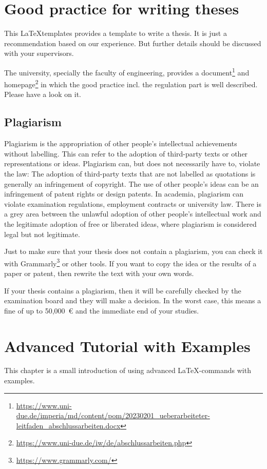 \chapter{Good practice for writing theses}
This \LaTeX templates provides a template to write a thesis. It is just a recommendation based on our experience. But further details should be discussed with your supervisors.

The university, specially the faculty of engineering, provides a document\footnote{\url{https://www.uni-due.de/imperia/md/content/pom/20230201_ueberarbeiteter-leitfaden_abschlussarbeiten.docx}} and homepage\footnote{\url{https://www.uni-due.de/iw/de/abschlussarbeiten.php}} in which the good practice incl. the regulation part is well described. Please have a look on it.
\section*{Plagiarism}
Plagiarism is the appropriation of other people's intellectual achievements without labelling. This can refer to the adoption of third-party texts or other representations or ideas. Plagiarism can, but does not necessarily have to, violate the law: The adoption of third-party texts that are not labelled as quotations is generally an infringement of copyright. The use of other people's ideas can be an infringement of patent rights or design patents. In academia, plagiarism can violate examination regulations, employment contracts or university law. There is a grey area between the unlawful adoption of other people's intellectual work and the legitimate adoption of free or liberated ideas, where plagiarism is considered legal but not legitimate.

Just to make sure that your thesis does not contain a plagiarism, you can check it with Grammarly\footnote{\url{https://www.grammarly.com/}} or other tools. If you want to copy the idea or the results of a paper or patent, then rewrite the text with your own words.

If your thesis contains a plagiarism, then it will be carefully checked by the examination board and they will make a decision. In the worst case, this means a fine of up to 50,000~€ and the immediate end of your studies.
\chapter{Advanced Tutorial with Examples}
This chapter is a small introduction of using advanced \LaTeX-commands with examples. 


